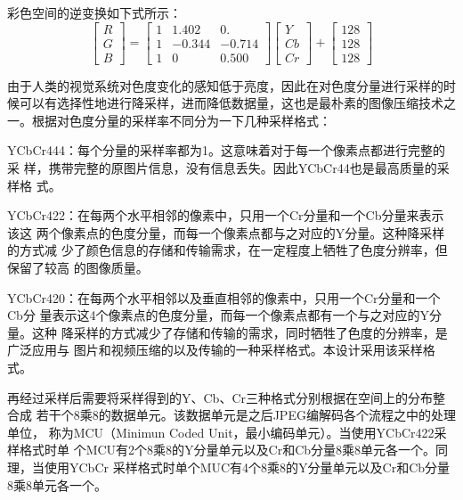 \documentclass{article}
\numberwithin {equation}{section}
\begin{document}
\begin{spacing}{1.25}
    彩色空间的逆变换如下式所示：
    \begin{equation}
      \begin{bmatrix}R\\ G\\ B\end{bmatrix}=
      \begin{bmatrix}
        1 & 1.402 & 0.\\
        1 & -0.344 & -0.714\\
        1 & 0 & 0.500
      \end{bmatrix}
      \begin{bmatrix}Y\\ Cb\\ Cr\end{bmatrix}+
      \begin{bmatrix}128\\ 128\\ 128\end{bmatrix}
      \label{YCbCr2RGB}
    \end{equation}

    由于人类的视觉系统对色度变化的感知低于亮度，因此在对色度分量进行采样的时
    候可以有选择性地进行降采样，进而降低数据量，这也是最朴素的图像压缩技术之
    一。根据对色度分量的采样率不同分为一下几种采样格式：
     
    YCbCr444：每个分量的采样率都为1。这意味着对于每一个像素点都进行完整的采
    样，携带完整的原图片信息，没有信息丢失。因此YCbCr44也是最高质量的采样格
    式。

    YCbCr422：在每两个水平相邻的像素中，只用一个Cr分量和一个Cb分量来表示该这
    两个像素点的色度分量，而每一个像素点都与之对应的Y分量。这种降采样的方式减
    少了颜色信息的存储和传输需求，在一定程度上牺牲了色度分辨率，但保留了较高
    的图像质量。

    YCbCr420：在每两个水平相邻以及垂直相邻的像素中，只用一个Cr分量和一个Cb分
    量表示这4个像素点的色度分量，而每一个像素点都有一个与之对应的Y分量。这种
    降采样的方式减少了存储和传输的需求，同时牺牲了色度的分辨率，是广泛应用与
    图片和视频压缩的以及传输的一种采样格式。本设计采用该采样格式。

    再经过采样后需要将采样得到的Y、Cb、Cr三种格式分别根据在空间上的分布整合成
    若干个8乘8的数据单元。该数据单元是之后JPEG编解码各个流程之中的处理单位，
    称为MCU（Minimun Coded Unit，最小编码单元）。当使用YCbCr422采样格式时单
    个MCU有2个8乘8的Y分量单元以及Cr和Cb分量8乘8单元各一个。同理，当使用YCbCr
    采样格式时单个MUC有4个8乘8的Y分量单元以及Cr和Cb分量8乘8单元各一个。

\end{spacing}
\end{document}
